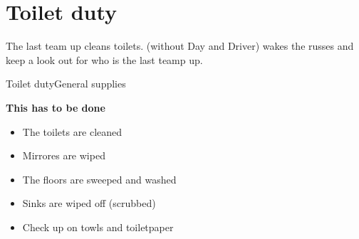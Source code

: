 \documentclass[../../../main.tex]{subfiles}
\begin{document}
\section{Toilet duty}
The last team up cleans toilets. \ALLV (without Day and Driver) wakes the russes and keep a look out for who is the last teamp up.

\begin{mats}{Toilet duty}{General supplies}
\end{mats}

\textbf{This has to be done}

\begin{itemize}
    \item The toilets are cleaned
    \item Mirrores are wiped
    \item The floors are sweeped and washed
    \item Sinks are wiped off (scrubbed)
    \item Check up on towls and toiletpaper
\end{itemize}
\end{document}
